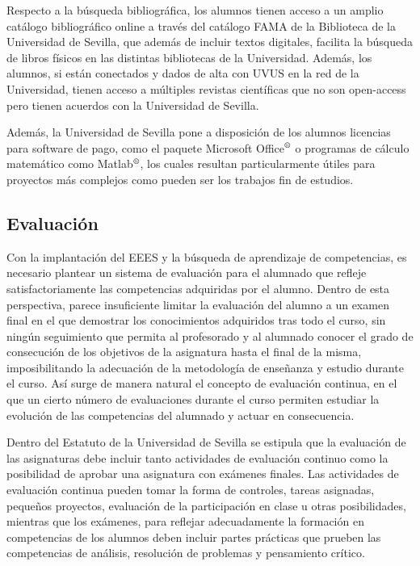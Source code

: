\documentclass[a4paper,12pt,twoside]{article}
\begin{document}
Respecto a la búsqueda bibliográfica, los alumnos tienen acceso a un amplio catálogo bibliográfico online a través del catálogo FAMA de la Biblioteca de la Universidad de Sevilla, que además de incluir textos digitales, facilita la búsqueda de libros físicos en las distintas bibliotecas de la Universidad. Además, los alumnos, si están conectados y dados de alta con UVUS en la red de la Universidad, tienen acceso a múltiples revistas científicas que no son open-access pero tienen acuerdos con la Universidad de Sevilla.

Además, la Universidad de Sevilla pone a disposición de los alumnos licencias para software de pago, como el paquete Microsoft Office$^\text{\textregistered}$ o programas de cálculo matemático como Matlab$^\text{\textregistered}$, los cuales resultan particularmente útiles para proyectos más complejos como pueden ser los trabajos fin de estudios.

\subsection{Evaluación}

Con la implantación del EEES y la búsqueda de aprendizaje de competencias, es necesario plantear un sistema de evaluación para el alumnado que refleje satisfactoriamente las competencias adquiridas por el alumno. Dentro de esta perspectiva, parece insuficiente limitar la evaluación del alumno a un examen final en el que demostrar los conocimientos adquiridos tras todo el curso, sin ningún seguimiento que permita al profesorado y al alumnado conocer el grado de consecución de los objetivos de la asignatura hasta el final de la misma, imposibilitando la adecuación de la metodología de enseñanza y estudio durante el curso. Así surge de manera natural el concepto de evaluación continua, en el que un cierto número de evaluaciones durante el curso permiten estudiar la evolución de las competencias del alumnado y actuar en consecuencia.

Dentro del Estatuto de la Universidad de Sevilla se estipula que la evaluación de las asignaturas debe incluir tanto actividades de evaluación continuo como la posibilidad de aprobar una asignatura con exámenes finales. Las actividades de evaluación continua pueden tomar la forma de controles, tareas asignadas, pequeños proyectos, evaluación de la participación en clase u otras posibilidades, mientras que los exámenes, para reflejar adecuadamente la formación en competencias de los alumnos deben incluir partes prácticas que prueben las competencias de análisis, resolución de problemas y pensamiento crítico.
\end{document}
